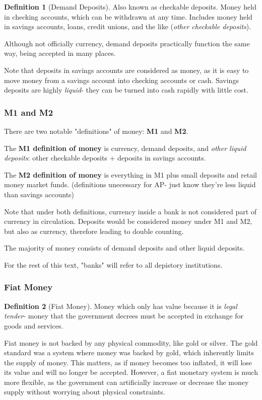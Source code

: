 \documentclass[12pt, a4paper]{article}
\theoremstyle{definition}
\newtheorem{definition}{Definition}
\begin{document}
\begin{definition}[Demand Deposits]
    Also known as checkable deposits.
    Money held in checking accounts, which can be withdrawn at any time.
    Includes money held in savings accounts, loans, credit unions, and the like (\textit{other checkable deposits}).
\end{definition}

Although not officially currency, demand deposits practically function the same way, being accepted in many places.

Note that deposits in savings accounts are considered as money, as it is easy to move money from a savings account into checking accounts or cash.
Savings deposits are highly \textit{liquid}- they can be turned into cash rapidly with little cost.

\subsubsection{M1 and M2}
There are two notable "definitions" of money: \textbf{M1} and \textbf{M2}.

The \textbf{M1 definition of money} is currency, demand deposits, and \textit{other liquid deposits}: other checkable deposits + deposits in savings accounts.

The \textbf{M2 definition of money} is everything in M1 plus small deposits and retail money market funds. (definitions unecessary for AP- just know they're less liquid than savings accounts)

Note that under both definitions, currency inside a bank is not considered part of currency in circulation.
Deposits would be considered money under M1 and M2, but also as currency, therefore leading to double counting.

The majority of money consists of demand deposits and other liquid deposits.

For the rest of this text, "banks" will refer to all depistory institutions.

\subsubsection{Fiat Money}
\begin{definition}[Fiat Money]
    Money which only has value because it is \textit{legal tender}- money that the government decrees must be accepted in exchange for goods and services.
\end{definition}

Fiat money is not backed by any physical commodity, like gold or silver.
The gold standard was a system where money was backed by gold, which inherently limits the supply of money.
This matters, as if money becomes too inflated, it will lose its value and will no longer be accepted.
However, a fiat monetary system is much more flexible, as the government can artificially increase or decrease the money supply without worrying about physical constraints.
\end{document}
